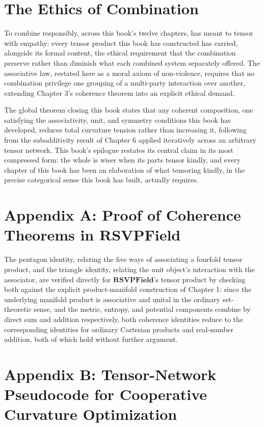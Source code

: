 \chapter{The Ethics of Combination}

To combine responsibly, across this book's twelve chapters, has meant to tensor with empathy: every tensor product this book has constructed has carried, alongside its formal content, the ethical requirement that the combination preserve rather than diminish what each combined system separately offered. The associative law, restated here as a moral axiom of non-violence, requires that no combination privilege one grouping of a multi-party interaction over another, extending Chapter 3's coherence theorem into an explicit ethical demand.

The global theorem closing this book states that any coherent composition, one satisfying the associativity, unit, and symmetry conditions this book has developed, reduces total curvature tension rather than increasing it, following from the subadditivity result of Chapter 6 applied iteratively across an arbitrary tensor network. This book's epilogue restates its central claim in its most compressed form: the whole is wiser when its parts tensor kindly, and every chapter of this book has been an elaboration of what tensoring kindly, in the precise categorical sense this book has built, actually requires.

\chapter*{Appendix A: Proof of Coherence Theorems in $\mathbf{RSVPField}$}

The pentagon identity, relating the five ways of associating a fourfold tensor product, and the triangle identity, relating the unit object's interaction with the associator, are verified directly for $\mathbf{RSVPField}$'s tensor product by checking both against the explicit product-manifold construction of Chapter 1: since the underlying manifold product is associative and unital in the ordinary set-theoretic sense, and the metric, entropy, and potential components combine by direct sum and addition respectively, both coherence identities reduce to the corresponding identities for ordinary Cartesian products and real-number addition, both of which hold without further argument.

\chapter*{Appendix B: Tensor-Network Pseudocode for Cooperative Curvature Optimization}


